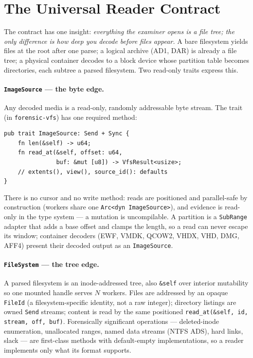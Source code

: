 \documentclass[10pt,twocolumn]{article}
\begin{document}
\section{The Universal Reader Contract}\label{sec:contract}

The contract has one insight: \emph{everything the examiner opens is a file tree;
the only difference is how deep you decode before files appear.} A bare
filesystem yields files at the root after one parse; a logical archive
(AD1, DAR) is already a file tree; a physical container decodes to a block device
whose partition table becomes directories, each subtree a parsed filesystem.
Two read-only traits express this.

\paragraph{\texttt{ImageSource} --- the byte edge.}
Any decoded media is a read-only, randomly addressable byte stream. The trait
(in \texttt{forensic-vfs}) has one required method:
\begin{lstlisting}
pub trait ImageSource: Send + Sync {
    fn len(&self) -> u64;
    fn read_at(&self, offset: u64,
               buf: &mut [u8]) -> VfsResult<usize>;
    // extents(), view(), source_id(): defaults
}
\end{lstlisting}
There is no cursor and no write method: reads are positioned and parallel-safe by
construction (workers share one \texttt{Arc<dyn ImageSource>}), and evidence is
read-only in the type system --- a mutation is uncompilable. A partition is a
\texttt{SubRange} adapter that adds a base offset and clamps the length, so a read
can never escape its window; container decoders (EWF, VMDK, QCOW2, VHDX, VHD, DMG,
AFF4) present their decoded output as an \texttt{ImageSource}.

\paragraph{\texttt{FileSystem} --- the tree edge.}
A parsed filesystem is an inode-addressed tree, also \texttt{\&self} over interior
mutability so one mounted handle serves $N$ workers. Files are addressed by an
opaque \texttt{FileId} (a filesystem-specific identity, not a raw integer);
directory listings are owned \texttt{Send} streams; content is read by the same
positioned \texttt{read\_at(\&self, id, stream, off, buf)}. Forensically
significant operations --- deleted-inode enumeration, unallocated ranges, named
data streams (NTFS ADS), hard links, slack --- are first-class methods with
default-empty implementations, so a reader implements only what its format
supports.
\end{document}
